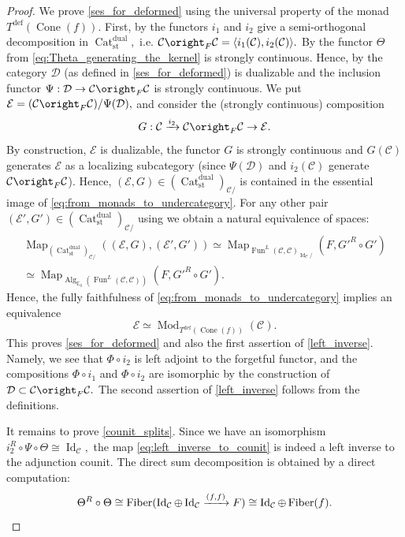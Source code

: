 \documentclass[11pt,leqno]{amsart}
\numberwithin{equation}{section}
\def\Map{\operatorname{Map}}
\newcommand{\xto}{\xrightarrow}
\newcommand{\Cat}{\operatorname{Cat}}
\newcommand{\Cone}{\operatorname{Cone}}
\newcommand{\Fiber}{\operatorname{Fiber}}
\newcommand{\st}{\operatorname{st}}
\newcommand{\dual}{\operatorname{dual}}
\newcommand{\deff}{\operatorname{def}}
\newcommand{\bE}{{\mathbb E}}
\newcommand{\cD}{{\mathcal D}}
\newcommand{\cC}{{\mathcal C}}
\newcommand{\cE}{{\mathcal E}}
\newcommand{\la}{\langle}
\newcommand{\ra}{\rangle}
\newcommand{\Fun}{\operatorname{Fun}}
\newcommand{\Id}{\operatorname{Id}}
\newcommand{\Alg}{\operatorname{Alg}}
\newcommand{\Mod}{\operatorname{Mod}}
\begin{document}
\begin{proof}
We prove \ref{ses_for_deformed} using the universal property of the monad $T^{\deff}(\Cone(f)).$ First, by \cite[Proposition 1.78]{E24} the functors $i_1$ and $i_2$ give a semi-orthogonal decomposition in $\Cat_{\st}^{\dual},$ i.e. $\cC\oright_F \cC=\la i_1(\cC), i_2(\cC)\ra.$ By \cite[Proposition 1.79]{E24} the functor $\Theta$ from \eqref{eq:Theta_generating_the_kernel} is strongly continuous. Hence, by \cite[Corollary 1.57]{E24} the category $\cD$ (as defined in \ref{ses_for_deformed}) is dualizable and the inclusion functor $\Psi:\cD\to\cC\oright_F \cC$ is strongly continuous. We put $\cE=(\cC\oright_F \cC)/\Psi(\cD),$ and consider the (strongly continuous) composition
\begin{equation*}
G:\cC\xto{i_2}\cC\oright_F \cC \to\cE.
\end{equation*}    
By construction, $\cE$ is dualizable, the functor $G$ is strongly continuous and $G(\cC)$ generates $\cE$ as a localizing subcategory (since $\Psi(\cD)$ and $i_2(\cC)$ generate $\cC\oright_F \cC$). Hence, $(\cE,G)\in(\Cat_{\st}^{\dual})_{\cC/}$ is contained in the essential image of \eqref{eq:from_monads_to_undercategory}. For any other pair $(\cE',G')\in (\Cat_{\st}^{\dual})_{\cC/}$ using \cite[Proposition 1.79]{E24} we obtain a natural equivalence of spaces:
\begin{multline*}
\Map_{(\Cat_{\st}^{\dual})_{\cC/}} ((\cE,G),(\cE',G'))\simeq \Map_{\Fun^L(\cC,\cC)_{\Id_{\cC}/}}(F,G'^R\circ G')\\
\simeq \Map_{\Alg_{\bE_0}(\Fun^L(\cC,\cC))}(F,G'^R\circ G').
\end{multline*}
Hence, the fully faithfulness of \eqref{eq:from_monads_to_undercategory} implies an equivalence
\begin{equation*}
\cE\simeq\Mod_{T^{\deff}(\Cone(f))}(\cC).
\end{equation*}
This proves \ref{ses_for_deformed} and also the first assertion of \ref{left_inverse}. Namely, we see that $\Phi\circ i_2$ is left adjoint to the forgetful functor, and the compositions $\Phi\circ i_1$ and $\Phi\circ i_2$ are isomorphic by the construction of $\cD\subset\cC\oright_F \cC.$ The second assertion of \ref{left_inverse} follows from the definitions.

It remains to prove \ref{counit_splits}. Since we have an isomorphism $i_2^R\circ \Psi\circ\Theta\cong \Id_{\cC},$ the map \eqref{eq:left_inverse_to_counit} is indeed a left inverse to the adjunction counit.  The direct sum decomposition is obtained by a direct computation:
\begin{equation*}
\Theta^R\circ\Theta \cong \Fiber(\Id_{\cC}\oplus \Id_{\cC}\xto{(f,f)}F)\cong \Id_{\cC}\oplus \Fiber(f).\qedhere
\end{equation*}
\end{proof}
\end{document}

